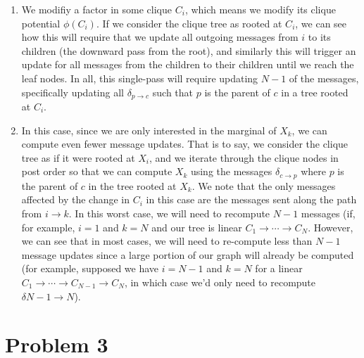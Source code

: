 \documentclass[12pt]{article}
\begin{document}
\begin{enumerate}[label=(\alph*)]
\item We modifiy a factor in some clique $C_i$, which means we modify its clique potential $\phi(C_i)$. If we consider the clique tree as rooted at $C_i$, we can see how this will require that we update all outgoing messages from $i$ to its children (the downward pass from the root), and similarly this will trigger an update for all messages from the children to their children until we reach the leaf nodes. In all, this single-pass will require updating $N-1$ of the messages, specifically updating all $\delta_{p \to c}$ such that $p$ is the parent of $c$ in a tree rooted at $C_i$.
\item In this case, since we are only interested in the marginal of $X_k$, we can compute even fewer message updates. That is to say, we consider the clique tree as if it were rooted at $X_i$, and we iterate through the clique nodes in post order so that we can compute $X_k$ using the messages $\delta_{c \to p}$ where $p$ is the parent of $c$ in the tree rooted at $X_k$. We note that the only messages affected by the change in $C_i$ in this case are the messages sent along the path from $i \to k$. In this worst case, we will need to recompute $N - 1$ messages (if, for example, $i = 1$ and $k=N$ and our tree is linear $C_1 \to \cdots \to C_N$. However, we can see that in most cases, we will need to re-compute less than $N - 1$ message updates since a large portion of our graph will already be computed (for example, supposed we have $i = N - 1$ and $k = N$ for a linear $C_ 1 \to \cdots \to C_{N-1} \to C_{N}$, in which case we'd only need to recompute $\delta{N-1 \to N}$).
\end{enumerate}

\pagebreak
\section*{Problem 3}
\end{document}
